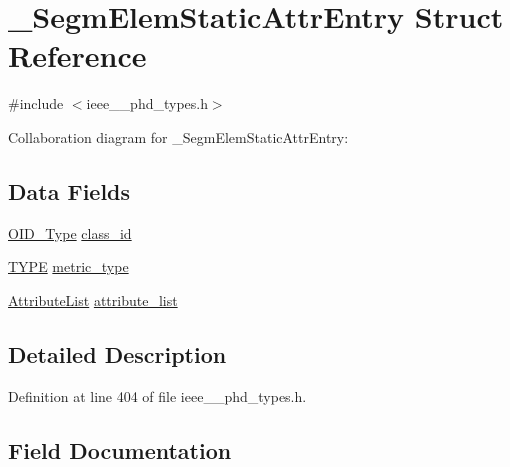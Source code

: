 \hypertarget{struct___segm_elem_static_attr_entry}{}\section{\+\_\+\+Segm\+Elem\+Static\+Attr\+Entry Struct Reference}
\label{struct___segm_elem_static_attr_entry}


{\ttfamily \#include $<$ieee\+\_\+\_\+phd\+\_\+types.\+h$>$}



Collaboration diagram for \+\_\+\+Segm\+Elem\+Static\+Attr\+Entry\+:
\subsection*{Data Fields}
\begin{DoxyCompactItemize}
\item 
\hyperlink{ieee__11073__phd__types_8h_aa4d7af235d4a95d6632aa0d64160dd62}{O\+I\+D\+\_\+\+Type} \hyperlink{struct___segm_elem_static_attr_entry_ad0a510237949ff545815366adea89f8b}{class\+\_\+id}
\item 
\hyperlink{ieee__11073__phd__types_8h_a56278ab9208915aa619527c8d826835a}{T\+Y\+P\+E} \hyperlink{struct___segm_elem_static_attr_entry_a34ce56177f5504256755d9e1d12f4435}{metric\+\_\+type}
\item 
\hyperlink{ieee__11073__phd__types_8h_a87a34d3be532804006242c172e4beea2}{Attribute\+List} \hyperlink{struct___segm_elem_static_attr_entry_a55d9d2bb0279117dc42540f02b5f934c}{attribute\+\_\+list}
\end{DoxyCompactItemize}


\subsection{Detailed Description}


Definition at line 404 of file ieee\+\_\+\_\+phd\+\_\+types.\+h.



\subsection{Field Documentation}
\hypertarget{struct___segm_elem_static_attr_entry_a55d9d2bb0279117dc42540f02b5f934c}{}
